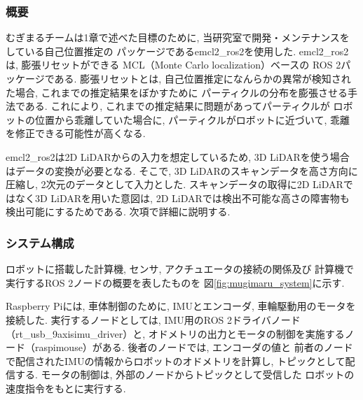 \subsubsection{概要}
むぎまるチームは1章で述べた目標のために, 
当研究室で開発・メンテナンスをしている自己位置推定の
パッケージであるemcl2\_ros2\cite{emcl2_ros2}を使用した. 
emcl2\_ros2は, 膨張リセット\cite{ueda2004iros}ができる
MCL（Monte Carlo localization\cite{fox1999etal}）ベースの
ROS 2パッケージである. 
膨張リセットとは, 
自己位置推定になんらかの異常が検知された場合, 
これまでの推定結果をぼかすために
パーティクルの分布を膨張させる手法である. 
これにより, これまでの推定結果に問題があってパーティクルが
ロボットの位置から乖離していた場合に, 
パーティクルがロボットに近づいて, 
乖離を修正できる可能性が高くなる. 


emcl2\_ros2は2D LiDARからの入力を想定しているため, 
3D LiDARを使う場合はデータの変換が必要となる. 
そこで, 3D LiDARのスキャンデータを高さ方向に圧縮し, 
2次元のデータとして入力とした. 
スキャンデータの取得に2D LiDARではなく3D LiDARを用いた意図は, 
2D LiDARでは検出不可能な高さの障害物も検出可能にするためである. 
次項で詳細に説明する. 

\subsubsection{システム構成}
ロボットに搭載した計算機, センサ, アクチュエータの接続の関係及び
計算機で実行するROS 2ノードの概要を表したものを
図\ref{fig:mugimaru_system}に示す. 

Raspberry Piには, 車体制御のために, IMUとエンコーダ, 車輪駆動用のモータを接続した. 
実行するノードとしては, IMU用のROS 2ドライバノード（rt\_usb\_9axisimu\_driver）と, 
オドメトリの出力とモータの制御を実施するノード（raspimouse）がある. 
後者のノードでは, エンコーダの値と
前者のノードで配信されたIMUの情報からロボットのオドメトリを計算し, 
トピックとして配信する. 
モータの制御は, 外部のノードからトピックとして受信した
ロボットの速度指令をもとに実行する. 

